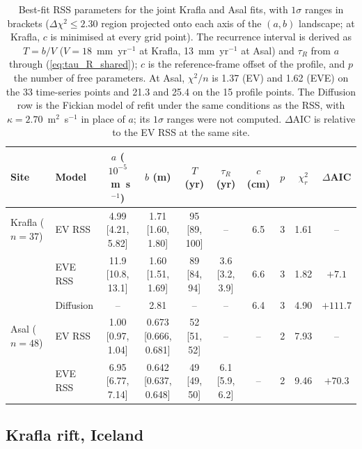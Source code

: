 \documentclass[extra]{gji}
\begin{document}
\begin{table}
\centering
\caption{Best-fit RSS parameters for the joint Krafla and Asal fits, with
  $1\sigma$ ranges in brackets ($\Delta\chi^2 \le 2.30$ region projected
  onto each axis of the $(a,b)$ landscape; at Krafla, $c$ is minimised at
  every grid point). The recurrence interval is derived as $T=b/V$
  ($V=18$~mm~yr$^{-1}$ at Krafla, 13~mm~yr$^{-1}$ at Asal) and $\tau_R$
  from $a$ through (\ref{eq:tau_R_shared}); $c$ is the reference-frame
  offset of the \citet{hofton1996post} profile, and $p$ the number of free
  parameters. At Asal, $\chi^2/n$ is 1.37 (EV) and 1.62 (EVE) on the 33
  time-series points and 21.3 and 25.4 on the 15 profile points.
  The Diffusion row is the Fickian model of \citet{foulger1992post} refit
  under the same conditions as the RSS, with
  $\kappa = 2.70$~m$^2$~s$^{-1}$ in place of $a$; its $1\sigma$ ranges were
  not computed. $\Delta$AIC is relative to the EV RSS at the same site.}
\label{tab:fits}
\begin{tabular}{llcccccccc}
\hline
Site & Model & $a$ ($10^{-5}$~m~s$^{-1}$) & $b$ (m) & $T$ (yr) & $\tau_R$ (yr) & $c$ (cm) & $p$ & $\chi^2_r$ & $\Delta$AIC \\
\hline
Krafla ($n=37$) & EV RSS  & 4.99 [4.21, 5.82] & 1.71 [1.60, 1.80] & 95 [89, 100] & --              & 6.5 & 3 & 1.61 & --      \\
                & EVE RSS & 11.9 [10.8, 13.1] & 1.60 [1.51, 1.69] & 89 [84, 94]  & 3.6 [3.2, 3.9]  & 6.6 & 3 & 1.82 & $+7.1$  \\
                & Diffusion & --              & 2.81              & --           & --              & 6.4 & 3 & 4.90 & $+111.7$ \\
\hline
Asal ($n=48$)   & EV RSS  & 1.00 [0.97, 1.04] & 0.673 [0.666, 0.681] & 52 [51, 52] & --             & --  & 2 & 7.93 & --      \\
                & EVE RSS & 6.95 [6.77, 7.14] & 0.642 [0.637, 0.648] & 49 [49, 50] & 6.1 [5.9, 6.2] & --  & 2 & 9.46 & $+70.3$ \\
\hline
\end{tabular}
\end{table}

\subsection{Krafla rift, Iceland}
\label{sec:krafla}
\end{document}
